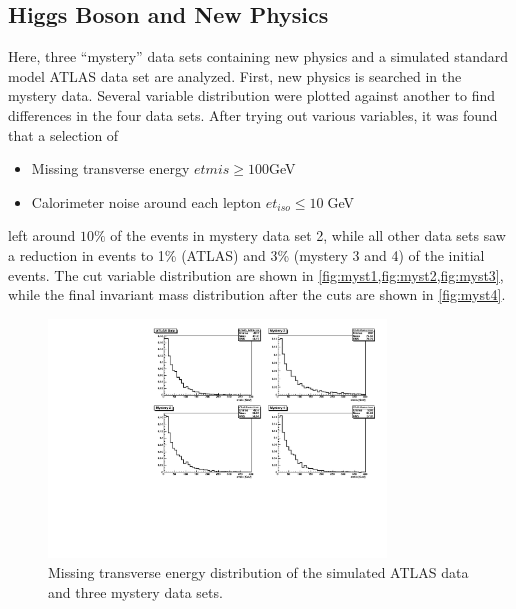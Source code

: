 \documentclass[twoside,        %
               BCOR12mm,       %
               ngerman,english, %
               fleqn,headsepline=false,footsepline=false
              ]{Vorlage/MFPREPORT}
\begin{document}
\subsection{Higgs Boson and New Physics}
Here, three ``mystery'' data sets containing new physics and a simulated
standard model ATLAS data set are analyzed.
First, new physics is searched in the mystery data. Several variable
distribution were plotted against another to find differences in the four data
sets. After trying out various variables, it was found that a selection of
\begin{itemize}
    \item Missing transverse energy $etmis\geq100$\;GeV
    \item Calorimeter noise around each lepton $et_{iso}\leq10\;$GeV
\end{itemize}
left around $10\%$ of the events in mystery data set 2, while all other data
sets saw a reduction in events to 1\% (ATLAS) and 3\% (mystery 3 and 4) of the
initial events. The cut variable distribution are shown in
\cref{fig:myst1,fig:myst2,fig:myst3}, while the final invariant mass distribution after
the cuts are shown in \cref{fig:myst4}.
\begin{figure}[]
    \begin{center}
        \includegraphics[width=0.8\textwidth]{ZZ/mystery_met_uncut.pdf}
    \end{center}
    \caption{Missing transverse energy distribution of the simulated ATLAS data and three mystery data sets.}
    \label{fig:myst1}
\end{figure}
\end{document}
